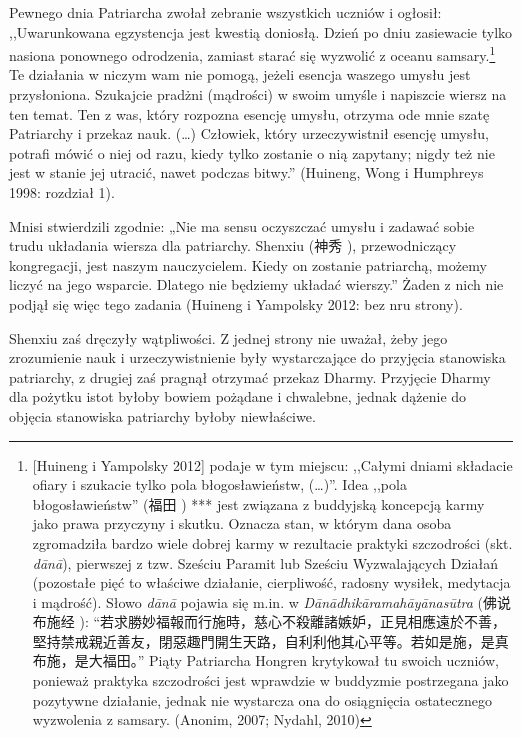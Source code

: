 Pewnego dnia Patriarcha zwołał zebranie wszystkich uczniów i ogłosił: ,,Uwarunkowana egzystencja jest kwestią doniosłą. Dzień po dniu zasiewacie tylko nasiona ponownego odrodzenia, zamiast starać się wyzwolić z oceanu samsary.\footnote{[Huineng i Yampolsky 2012] podaje w tym miejscu: ,,Całymi dniami składacie ofiary i szukacie tylko pola błogosławieństw, (\ldots)''. Idea ,,pola błogosławieństw'' (福田 ) *** jest związana z buddyjską koncepcją karmy jako prawa przyczyny i skutku. Oznacza stan, w którym dana osoba zgromadziła bardzo wiele dobrej karmy w rezultacie praktyki szczodrości (skt. \textit{dānā}), pierwszej z tzw. Sześciu Paramit lub Sześciu Wyzwalających Działań (pozostałe pięć to właściwe działanie, cierpliwość, radosny wysiłek, medytacja i mądrość). Słowo \textit{dānā} pojawia się m.in. w \textit{Dānādhikāramahāyānasūtra} (佛说布施经 ): “若求勝妙福報而行施時，慈心不殺離諸嫉妒，正見相應遠於不善，堅持禁戒親近善友，閉惡趣門開生天路，自利利他其心平等。若如是施，是真布施，是大福田。” Piąty Patriarcha Hongren krytykował tu swoich uczniów, ponieważ praktyka szczodrości jest wprawdzie w buddyzmie postrzegana jako pozytywne działanie, jednak nie wystarcza ona do osiągnięcia ostatecznego wyzwolenia z samsary. (Anonim, 2007; Nydahl, 2010)} Te działania w niczym wam nie pomogą, jeżeli esencja waszego umysłu jest przysłoniona. Szukajcie pradżni (mądrości) w swoim umyśle i napiszcie wiersz na ten temat. Ten z was, który rozpozna esencję umysłu, otrzyma ode mnie szatę Patriarchy i przekaz nauk. (\ldots) Człowiek, który urzeczywistnił esencję umysłu, potrafi mówić o niej od razu, kiedy tylko zostanie o nią zapytany; nigdy też nie jest w stanie jej utracić, nawet podczas bitwy.'' (Huineng, Wong i Humphreys 1998: rozdział 1).

Mnisi stwierdzili zgodnie: „Nie ma sensu oczyszczać umysłu i zadawać sobie trudu układania wiersza dla patriarchy. Shenxiu (神秀 ), przewodniczący kongregacji, jest naszym nauczycielem. Kiedy on zostanie patriarchą, możemy liczyć na jego wsparcie. Dlatego nie będziemy układać wierszy.” Żaden z nich nie podjął się więc tego zadania (Huineng i Yampolsky 2012: bez nru strony).

Shenxiu zaś dręczyły wątpliwości. Z jednej strony nie uważał, żeby jego zrozumienie nauk i urzeczywistnienie były wystarczające do przyjęcia stanowiska patriarchy, z drugiej zaś pragnął otrzymać przekaz Dharmy. Przyjęcie Dharmy dla pożytku istot byłoby bowiem pożądane i chwalebne, jednak dążenie do objęcia stanowiska patriarchy byłoby niewłaściwe.

